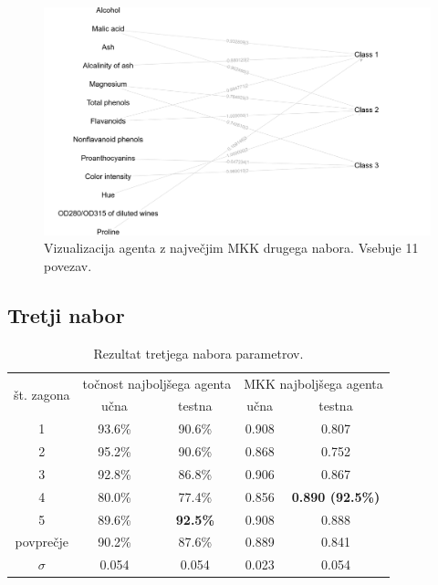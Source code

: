 \begin{figure}[H]
    \begin{center}
        \includegraphics[width=13cm]{wine/2/mcc_g}
    \end{center}
    \caption{Vizualizacija agenta z največjim MKK drugega nabora. Vsebuje 11 povezav.}
    \label{fig:wine_mcc_2_g}
\end{figure}

\subsection{Tretji nabor}\label{subsec:dodatek-wine-tretji-nabor}
\begin{table}[H]
    \begin{center}
        \begin{tabular}{|| c | c c || c c ||}
            \hline
            \multirow{2}{*}{št. zagona} & \multicolumn{2}{c||}{točnost najboljšega agenta} & \multicolumn{2}{c||}{MKK najboljšega agenta} \\ \cline{2-5}
            & učna   & testna          & učna  & testna                  \\
            \hline
            1         & 93.6\% & 90.6\%          & 0.908 & 0.807                   \\
            \hline
            2         & 95.2\% & 90.6\%          & 0.868 & 0.752                   \\
            \hline
            3         & 92.8\% & 86.8\%          & 0.906 & 0.867                   \\
            \hline
            4         & 80.0\% & 77.4\%          & 0.856 & \textbf{0.890 (92.5\%)} \\
            \hline
            5         & 89.6\% & \textbf{92.5\%} & 0.908 & 0.888                   \\
            \hline
            povprečje & 90.2\% & 87.6\%          & 0.889 & 0.841                   \\
            \hline
            $\sigma$  & 0.054  & 0.054           & 0.023 & 0.054                   \\
            \hline
        \end{tabular}
    \end{center}
    \caption{Rezultat tretjega nabora parametrov.}
    \label{tab:wine_result_3}
\end{table}

